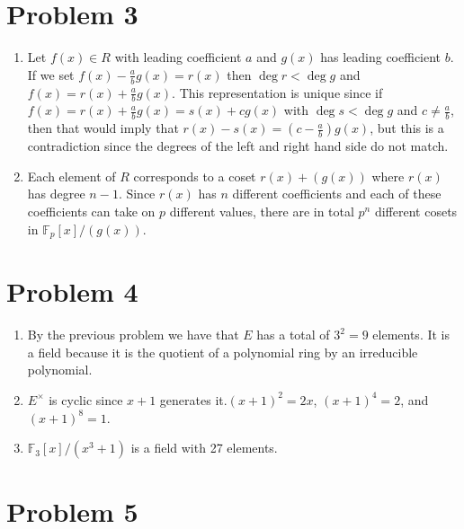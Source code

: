 \documentclass{article}
\begin{document}
\section*{Problem 3}
\begin{enumerate}
	\item Let $f(x) \in R$ with leading coefficient $a$ and $g(x)$ has leading coefficient $b$.
	If we set $f(x) - \frac{a}{b}g(x) = r(x)$ then $\deg r < \deg g$ and $f(x) = r(x) + \frac{a}{b}g(x)$.
	This representation is unique since if $f(x) = r(x) + \frac{a}{b}g(x) = s(x) + cg(x)$ with $\deg s < \deg g$ and $c \neq \frac{a}{b}$,
	then that would imply that $r(x) - s(x) = (c-\frac{a}{b})g(x)$, 
	but this is a contradiction since the degrees of the left and right hand side do not match.
	\item Each element of $R$ corresponds to a coset $r(x) + (g(x))$ where $r(x)$ has degree $n-1$.
	Since $r(x)$ has $n$ different coefficients and each of these coefficients can take on $p$ different values,
	there are in total $p^n$ different cosets in $\mathbb{F}_p[x]/(g(x))$.
\end{enumerate}
\newpage 

\section*{Problem 4}
\begin{enumerate}
	\item By the previous problem we have that $E$ has a total of $3^2 = 9$ elements. 
	It is a field because it is the quotient of a polynomial ring by an irreducible polynomial.
	\item $E^\times$ is cyclic since $x+1$ generates it.$(x+1)^2 = 2x$, $(x+1)^4 = 2$, and $(x+1)^8 = 1$.
	\item $\mathbb{F}_3[x]/(x^3+1)$ is a field with 27 elements.
\end{enumerate}
\newpage 

\section*{Problem 5}
\end{document}
